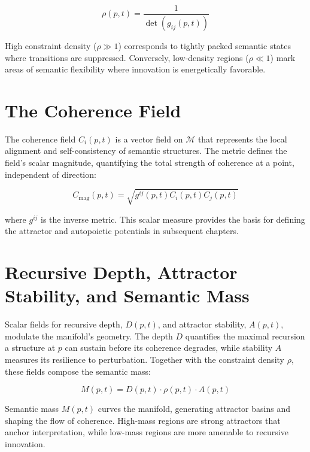 \begin{equation}
\rho(p, t) = \frac{1}{\det(g_{ij}(p, t))}
\end{equation}

High constraint density (\(\rho \gg 1\)) corresponds to tightly packed semantic states where transitions are suppressed. Conversely, low-density regions (\(\rho \ll 1\)) mark areas of semantic flexibility where innovation is energetically favorable.


\section{The Coherence Field}
\label{3.5:the_coherence_field}

The coherence field \(C_i(p, t)\) is a vector field on \(\mathcal{M}\) that represents the local alignment and self-consistency of semantic structures. The metric defines the field's scalar magnitude, quantifying the total strength of coherence at a point, independent of direction:

\begin{equation}
C_{\mathrm{mag}}(p, t) = \sqrt{g^{ij}(p, t) C_i(p, t) C_j(p, t)}
\end{equation}

where \(g^{ij}\) is the inverse metric. This scalar measure provides the basis for defining the attractor and autopoietic potentials in subsequent chapters.


\section{Recursive Depth, Attractor Stability, and Semantic Mass}
\label{3.6:recursive_depth_attractor_stability_and_semantic_mass}

Scalar fields for recursive depth, \(D(p, t)\), and attractor stability, \(A(p, t)\), modulate the manifold's geometry. The depth \(D\) quantifies the maximal recursion a structure at \(p\) can sustain before its coherence degrades, while stability \(A\) measures its resilience to perturbation. Together with the constraint density \(\rho\), these fields compose the semantic mass:

\begin{equation}
M(p, t) = D(p, t) \cdot \rho(p, t) \cdot A(p, t)
\end{equation}

Semantic mass \(M(p,t)\) curves the manifold, generating attractor basins and shaping the flow of coherence. High-mass regions are strong attractors that anchor interpretation, while low-mass regions are more amenable to recursive innovation. 